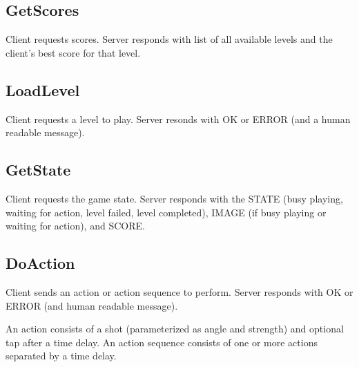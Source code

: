 \documentclass[10pt,a4paper]{article}
\numberwithin{equation}{section}
\begin{document}
\subsection{GetScores}

Client requests scores. Server responds with list of all available
levels and the client's best score for that level.

\subsection{LoadLevel}

Client requests a level to play. Server resonds with OK or ERROR (and
a human readable message).

\subsection{GetState}

Client requests the game state. Server responds with the STATE (busy
playing, waiting for action, level failed, level completed), IMAGE (if
busy playing or waiting for action), and SCORE.

\subsection{DoAction}

Client sends an action or action sequence to perform. Server responds
with OK or ERROR (and human readable message).

An action consists of a shot (parameterized as angle and strength) and
optional tap after a time delay. An action sequence consists of one or
more actions separated by a time delay.
\end{document}
